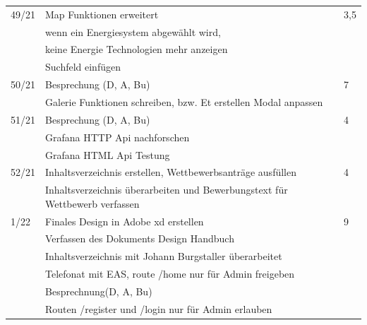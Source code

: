 \begin{table}[h]
\begin{tabular}{|l|l|l|}
	49/21 	&Map Funktionen erweitert & 3,5 \\
			&wenn ein Energiesystem abgewählt wird,  &\\
			&keine Energie Technologien mehr anzeigen&\\
			&Suchfeld einfügen&\\ \hline
	50/21 	&Besprechung (D, A, Bu)& 7 \\
			&Galerie Funktionen schreiben, bzw. Et erstellen Modal anpassen &\\ \hline
	51/21 	&Besprechung (D, A, Bu) & 4 \\
			&Grafana HTTP Api nachforschen& \\
			&Grafana HTML Api Testung & \\ \hline
	52/21	&Inhaltsverzeichnis erstellen, Wettbewerbsanträge ausfüllen & 4 \\
			&Inhaltsverzeichnis überarbeiten und Bewerbungstext für Wettbewerb verfassen&\\ \hline
	1/22	&Finales Design in Adobe xd erstellen& 9 \\
			&Verfassen des Dokuments Design Handbuch &\\
			&  Inhaltsverzeichnis mit Johann Burgstaller überarbeitet& \\
			&Telefonat mit EAS, route /home nur für Admin freigeben &\\
			& Besprechnung(D, A, Bu) &\\
			&Routen /register und /login nur für Admin erlauben&\\ \hline
			
	\end{tabular}
\end{table}
\newpage
